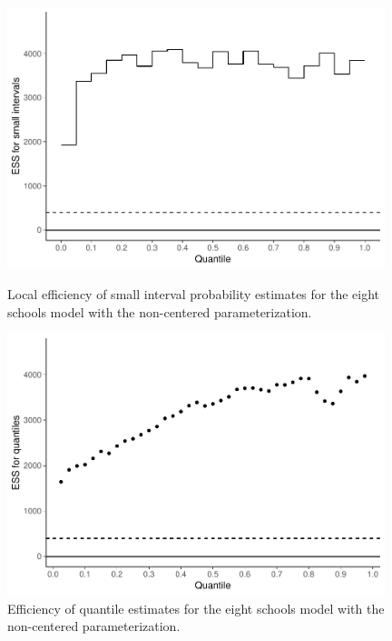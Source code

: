 \documentclass[american,]{article}
\theoremstyle{definition}
\begin{document}
\begin{figure}[tp]
  \begin{minipage}{0.48\textwidth}
  \centering
  \includegraphics[width=0.98\textwidth]{graphics/local-ess-fit-ncp2-1.pdf}
  \caption{Local efficiency of small interval probability estimates for the  
  eight schools model with the non-centered parameterization.}
  \label{fig:local-ess-fit-ncp2-1}
\end{minipage}
\hfill
  \begin{minipage}{0.48\textwidth}
  \includegraphics[width=0.98\textwidth]{graphics/quantile-ess-fit-ncp2-1.pdf}
  \caption{Efficiency of quantile estimates for the eight schools model with 
  the non-centered parameterization.}
  \label{fig:quantile-ess-fit-ncp2-1}
\end{minipage}
\end{figure}
\end{document}

